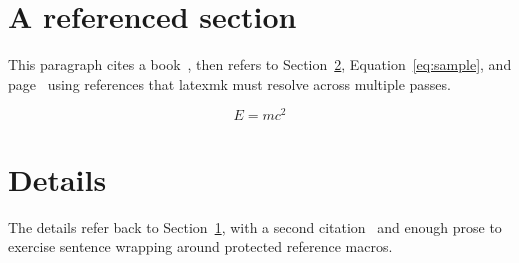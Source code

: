 \documentclass{article}
\begin{document}
\section{A referenced section}\label{sec:introduction}
This paragraph cites a book~\cite{knuth1984}, then refers to Section~\ref{sec:details}, Equation~\ref{eq:sample}, and page~\pageref{sec:details} using references that latexmk must resolve across multiple passes.

\begin{equation}\label{eq:sample}
  E = mc^2
\end{equation}

\newpage
\section{Details}\label{sec:details}
The details refer back to Section~\ref{sec:introduction}, with a second citation~\cite{lamport1994} and enough prose to exercise sentence wrapping around protected reference macros.



\end{document}
